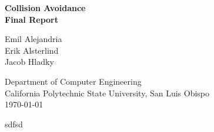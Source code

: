 \documentclass[12pt]{article}
\begin{document}
\begin{titlepage}
  \begin{center}
    \vspace*{1cm}
    \Huge{\textbf{
      Collision Avoidance\\
      Final Report
    }}

    \vfill
    \large{
      Emil Alejandria\\
      Erik Alsterlind\\
      Jacob Hladky\\
    }

    \vspace{1cm}

    \large{
      Department of Computer Engineering\\
      California Polytechnic State University, San Luis Obispo\\
      \today
    }

  \end{center}
\end{titlepage}

  sdfsd
\end{document}
